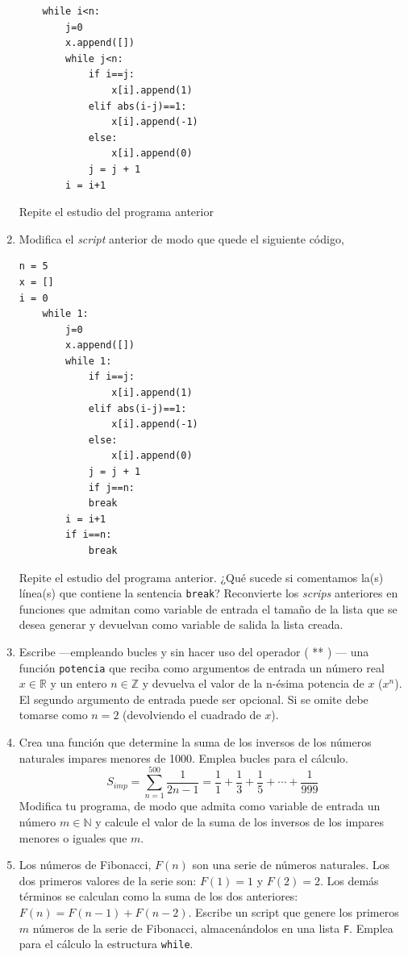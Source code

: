 \begin{enumerate}
\begin{verbatim}
	while i<n:
		j=0
		x.append([])
		while j<n:        
			if i==j:
				x[i].append(1)
			elif abs(i-j)==1:
				x[i].append(-1)
			else:
				x[i].append(0)
			j = j + 1
		i = i+1
\end{verbatim}

Repite el estudio del programa anterior

\item Modifica el \emph{script} anterior de modo que quede el siguiente código,
\begin{verbatim}
n = 5
x = []
i = 0
	while 1:
		j=0
		x.append([])
		while 1:        
			if i==j:
				x[i].append(1)
			elif abs(i-j)==1:
				x[i].append(-1)
			else:
				x[i].append(0)
			j = j + 1
			if j==n:
			break
		i = i+1
		if i==n:
			break
\end{verbatim}
Repite el estudio del programa anterior. ¿Qué sucede si comentamos la(s) línea(s) que contiene la sentencia \verb|break|?
Reconvierte los \emph{scrips} anteriores en funciones que admitan como variable de entrada el tamaño de la lista que se desea generar y devuelvan como variable de salida la lista creada.

\item Escribe ---empleando bucles y sin hacer uso del operador ( ** ) --- una función \verb|potencia| que reciba como argumentos de entrada un número real $x\in \mathbb{R}$ y un entero $n \in \mathbb{Z}$ y devuelva el valor de la n-ésima potencia de $x$ ($x^n$). El segundo argumento de entrada puede ser opcional. Si se omite debe tomarse como $n=2$ (devolviendo el cuadrado de $x$).

\item Crea una función que determine la suma de los inversos de los números naturales impares menores de 1000. Emplea bucles para el cálculo.
\begin{equation*}
S_{imp} = \sum_{n=1}^{500}\frac{1}{2n-1} =\frac{1}{1}+\frac{1}{3}+\frac{1}{5}+\cdots+\frac{1}{999}
\end{equation*}
Modifica tu programa, de modo que admita como variable de entrada un número $m\in\mathbb{N}$ y calcule el valor de la suma de los inversos de los impares menores o iguales que $m$.

\item Los números de Fibonacci, $F(n)$ son una serie de números naturales. Los dos primeros valores de la serie son:  $F(1)=1$ y $F(2)=2$. Los demás términos se calculan como la suma de los dos anteriores: $F(n) = F(n-1) + F(n-2)$.
Escribe un script que genere los primeros $m$ números de la serie de Fibonacci, almacenándolos en una lista \verb|F|. Emplea para el cálculo la estructura \verb|while|.\label{fibonacci}


\end{enumerate}
